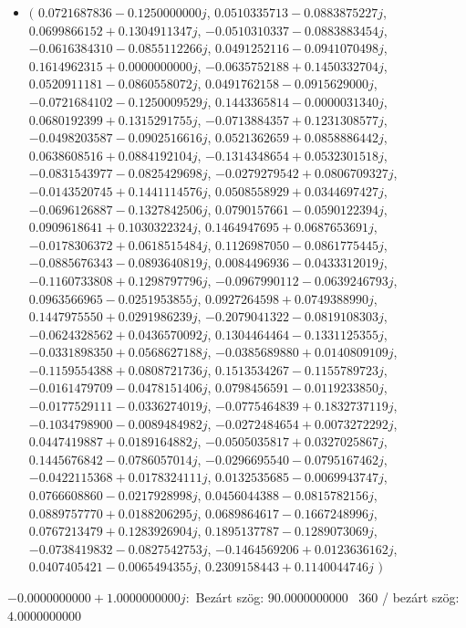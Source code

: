\documentclass[14pt,a4paper]{article}
\begin{document}
\begin{itemize}
\item
$\big($
$0.0721687836-0.1250000000j$, $0.0510335713-0.0883875227j$, $0.0699866152+0.1304911347j$, $-0.0510310337-0.0883883454j$, $-0.0616384310-0.0855112266j$, $0.0491252116-0.0941070498j$, $0.1614962315+0.0000000000j$, $-0.0635752188+0.1450332704j$, $0.0520911181-0.0860558072j$, $0.0491762158-0.0915629000j$, $-0.0721684102-0.1250009529j$, $0.1443365814-0.0000031340j$, $0.0680192399+0.1315291755j$, $-0.0713884357+0.1231308577j$, $-0.0498203587-0.0902516616j$, $0.0521362659+0.0858886442j$, $0.0638608516+0.0884192104j$, $-0.1314348654+0.0532301518j$, $-0.0831543977-0.0825429698j$, $-0.0279279542+0.0806709327j$, $-0.0143520745+0.1441114576j$, $0.0508558929+0.0344697427j$, $-0.0696126887-0.1327842506j$, $0.0790157661-0.0590122394j$, $0.0909618641+0.1030322324j$, $0.1464947695+0.0687653691j$, $-0.0178306372+0.0618515484j$, $0.1126987050-0.0861775445j$, $-0.0885676343-0.0893640819j$, $0.0084496936-0.0433312019j$, $-0.1160733808+0.1298797796j$, $-0.0967990112-0.0639246793j$, $0.0963566965-0.0251953855j$, $0.0927264598+0.0749388990j$, $0.1447975550+0.0291986239j$, $-0.2079041322-0.0819108303j$, $-0.0624328562+0.0436570092j$, $0.1304464464-0.1331125355j$, $-0.0331898350+0.0568627188j$, $-0.0385689880+0.0140809109j$, $-0.1159554388+0.0808721736j$, $0.1513534267-0.1155789723j$, $-0.0161479709-0.0478151406j$, $0.0798456591-0.0119233850j$, $-0.0177529111-0.0336274019j$, $-0.0775464839+0.1832737119j$, $-0.1034798900-0.0089484982j$, $-0.0272484654+0.0073272292j$, $0.0447419887+0.0189164882j$, $-0.0505035817+0.0327025867j$, $0.1445676842-0.0786057014j$, $-0.0296695540-0.0795167462j$, $-0.0422115368+0.0178324111j$, $0.0132535685-0.0069943747j$, $0.0766608860-0.0217928998j$, $0.0456044388-0.0815782156j$, $0.0889757770+0.0188206295j$, $0.0689864617-0.1667248996j$, $0.0767213479+0.1283926904j$, $0.1895137787-0.1289073069j$, $-0.0738419832-0.0827542753j$, $-0.1464569206+0.0123636162j$, $0.0407405421-0.0065494355j$, $0.2309158443+0.1140044746j$
$\big)$
\end{itemize}
$-0.0000000000+1.0000000000j$:\
Bezárt szög: $90.0000000000$ \
360 / bezárt szög: $4.0000000000$\
\end{document}
